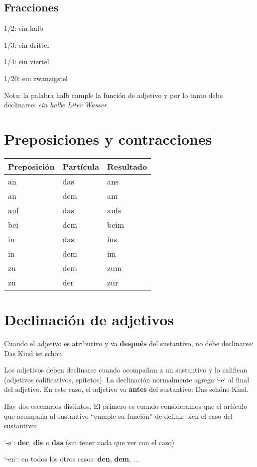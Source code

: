 \subsection{Fracciones}
\begin{multicols}{2}
\begin{myitemize}
\item 1/2: ein halb
\item 1/3: ein drittel
\item 1/4: ein viertel
\item 1/20: ein zwanzigstel
\end{myitemize}
\end{multicols}
Nota: la palabra halb cumple la función de adjetivo y por lo tanto debe declinarse: \textit{ein halbe Liter Wasser}.


\section{Preposiciones y contracciones}
\begin{tabular}{| l | l | l |}
\hline
\textbf{Preposición} & \textbf{Partícula} & \textbf{Resultado} \\
\hline
an & das & ans \\
an & dem & am \\
auf & das & aufs \\
bei & dem & beim \\
in & das & ins \\
in & dem & im \\
zu & dem & zum \\
zu & der & zur \\
\hline
\end{tabular}

\section{Declinación de adjetivos}
Cuando el adjetivo es atributivo y va \textbf{después} del sustantivo, no debe declinarse: Das Kind ist schön.

Los adjetivos deben declinarse cuando acompañan a un sustantivo y lo califican (adjetivos calificativos, epítetos). La declinación normalmente agrega `-e` al final del adjetivo. En este caso, el adjetivo va \textbf{antes} del sustantivo: Das schöne Kind. 

Hay dos escenarios distintos. El primero es cuando consideramos que el artículo que acompaña al sustantivo ``cumple su función'' de definir bien el caso del sustantivo:
\begin{myitemize}
\item `-e`: \textbf{der}, \textbf{die} o \textbf{das} (sin tener nada que ver con el caso)
\item `-en`: en todos los otros casos: \textbf{den}, \textbf{dem}, ...
\end{myitemize}

